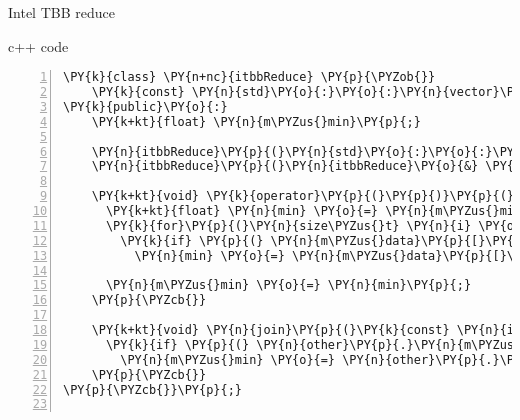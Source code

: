 \documentclass{beamer}
\begin{document}


\begin{frame}[fragile]{Intel TBB reduce}

\begin{block}{c++ code}

\tiny
\begin{Verbatim}[commandchars=\\\{\},numbers=left,firstnumber=1,stepnumber=1]
\PY{k}{class} \PY{n+nc}{itbbReduce} \PY{p}{\PYZob{}}
    \PY{k}{const} \PY{n}{std}\PY{o}{:}\PY{o}{:}\PY{n}{vector}\PY{o}{<}\PY{k+kt}{float}\PY{o}{>}\PY{o}{&} \PY{n}{m\PYZus{}data}\PY{p}{;}
\PY{k}{public}\PY{o}{:}
    \PY{k+kt}{float} \PY{n}{m\PYZus{}min}\PY{p}{;}

    \PY{n}{itbbReduce}\PY{p}{(}\PY{n}{std}\PY{o}{:}\PY{o}{:}\PY{n}{vector}\PY{o}{<}\PY{k+kt}{float}\PY{o}{>}\PY{o}{&} \PY{n}{data}\PY{p}{)} \PY{o}{:} \PY{n}{m\PYZus{}data}\PY{p}{(}\PY{n}{data}\PY{p}{)} \PY{p}{,} \PY{n}{m\PYZus{}min}\PY{p}{(}\PY{n}{FLT\PYZus{}MAX}\PY{p}{)} \PY{p}{\PYZob{}}\PY{p}{\PYZcb{}}
    \PY{n}{itbbReduce}\PY{p}{(}\PY{n}{itbbReduce}\PY{o}{&} \PY{n}{other}\PY{p}{,} \PY{n}{tbb}\PY{o}{:}\PY{o}{:}\PY{n}{split}\PY{p}{)} \PY{o}{:} \PY{n}{m\PYZus{}data}\PY{p}{(}\PY{n}{other}\PY{p}{.}\PY{n}{m\PYZus{}data}\PY{p}{)}\PY{p}{,} \PY{n}{m\PYZus{}min}\PY{p}{(}\PY{n}{FLT\PYZus{}MAX}\PY{p}{)} \PY{p}{\PYZob{}}\PY{p}{\PYZcb{}}

    \PY{k+kt}{void} \PY{k}{operator}\PY{p}{(}\PY{p}{)}\PY{p}{(}\PY{k}{const} \PY{n}{tbb}\PY{o}{:}\PY{o}{:}\PY{n}{blocked\PYZus{}range}\PY{o}{<}\PY{n}{size\PYZus{}t}\PY{o}{>}\PY{o}{&} \PY{n}{r}\PY{p}{)} \PY{p}{\PYZob{}}
      \PY{k+kt}{float} \PY{n}{min} \PY{o}{=} \PY{n}{m\PYZus{}min}\PY{p}{;}
      \PY{k}{for}\PY{p}{(}\PY{n}{size\PYZus{}t} \PY{n}{i} \PY{o}{=} \PY{n}{r}\PY{p}{.}\PY{n}{begin}\PY{p}{(}\PY{p}{)}\PY{p}{;} \PY{n}{i} \PY{o}{!}\PY{o}{=} \PY{n}{r}\PY{p}{.}\PY{n}{end}\PY{p}{(}\PY{p}{)}\PY{p}{;} \PY{n}{i}\PY{o}{+}\PY{o}{+}\PY{p}{)}
        \PY{k}{if} \PY{p}{(} \PY{n}{m\PYZus{}data}\PY{p}{[}\PY{n}{i}\PY{p}{]} \PY{o}{<} \PY{n}{min} \PY{p}{)}
          \PY{n}{min} \PY{o}{=} \PY{n}{m\PYZus{}data}\PY{p}{[}\PY{n}{i}\PY{p}{]}\PY{p}{;}

      \PY{n}{m\PYZus{}min} \PY{o}{=} \PY{n}{min}\PY{p}{;}
    \PY{p}{\PYZcb{}}

    \PY{k+kt}{void} \PY{n}{join}\PY{p}{(}\PY{k}{const} \PY{n}{itbbReduce}\PY{o}{&} \PY{n}{other}\PY{p}{)} \PY{p}{\PYZob{}}
      \PY{k}{if} \PY{p}{(} \PY{n}{other}\PY{p}{.}\PY{n}{m\PYZus{}min} \PY{o}{<} \PY{n}{m\PYZus{}min} \PY{p}{)}
        \PY{n}{m\PYZus{}min} \PY{o}{=} \PY{n}{other}\PY{p}{.}\PY{n}{m\PYZus{}min}\PY{p}{;}
    \PY{p}{\PYZcb{}}
\PY{p}{\PYZcb{}}\PY{p}{;}


\end{Verbatim}
\end{block}
\end{frame}
\end{document}

